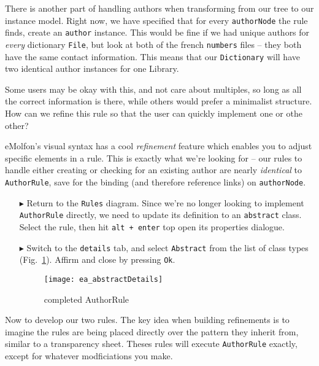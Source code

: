 There is another part of handling authors when transforming from our tree to our instance model. Right now, we have specified that
for every \texttt{authorNode} the rule finds, create an \texttt{author} instance. This would be fine if we had unique authors for \emph{every} dictionary
\texttt{File}, but look at both of the french \texttt{numbers} files -- they both have the same contact information. This means that our \texttt{Dictionary}
will have two identical author instances for one Library. 

Some users may be okay with this, and not care about multiples, so long as all the correct information is there, while others would prefer a minimalist
structure. How can we refine this rule so that the user can quickly implement one or othe other?

eMolfon's visual syntax has a cool \emph{refinement} feature which enables you to adjust specific elements in a rule. This is exactly what we're looking for --
our rules to handle either creating or checking for an existing author are nearly \emph{identical} to \texttt{AuthorRule}, save for the binding (and therefore
reference links) on \texttt{authorNode}.

\begin{itemize}

\item[$\blacktriangleright$] Return to the \texttt{Rules} diagram. Since we're no longer looking to implement \texttt{AuthorRule} directly, we need to update
its definition to an \texttt{abstract} class. Select the rule, then hit \texttt{alt + enter} top open its properties dialogue.

\item[$\blacktriangleright$] Switch to the \texttt{details} tab, and select \texttt{Abstract} from the list of class types (Fig.~\ref{ea:abstractDetails}). 
Affirm and close by pressing \texttt{Ok}.

\begin{figure}[htbp]
\begin{center}
  \texttt{[image: ea\_abstractDetails]}
  \caption{completed AuthorRule}
  \label{ea:abstractDetails}
\end{center}
\end{figure}

\end{itemize}

Now to develop our two rules. The key idea when building refinements is to imagine the rules are being placed directly over the
pattern they inherit from, similar to a transparency sheet. Theses rules will execute \texttt{AuthorRule} exactly, except for whatever modficiations you make.

